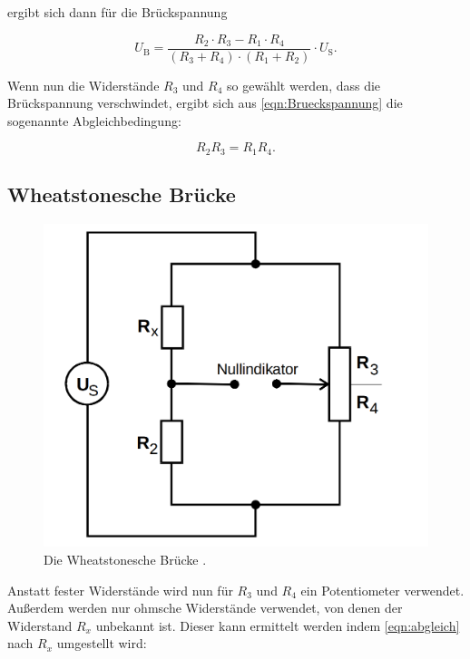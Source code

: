 ergibt sich dann für die Brückspannung 

\begin{equation}
    U_\text{B} = \frac{R_2\cdot R_3 - R_1 \cdot R_4}{(R_3 + R_4) \cdot (R_1 + R_2)} \cdot U_\text{S} .
    \label{eqn:Brueckspannung}
\end{equation}

Wenn nun die Widerstände $R_3$ und $R_4$ so gewählt werden, dass die Brückspannung verschwindet,
ergibt sich aus \eqref{eqn:Brueckspannung} die sogenannte Abgleichbedingung:

\begin{equation}
    R_2 R_3 = R_1 R_4 .
    \label{eqn:abgleich}
\end{equation}

\subsection{Wheatstonesche Brücke}

\begin{figure}
    \centering
    \includegraphics[scale=0.25]{content/Wheatstonesche.png}
    \caption{Die Wheatstonesche Brücke \cite[S. 219]{anleitung}.}
    \label{fig:wheatstonesche}
\end{figure}

Anstatt fester Widerstände wird nun für $R_3$ und $R_4$ ein Potentiometer verwendet.
Außerdem werden nur ohmsche Widerstände verwendet, von denen der Widerstand $R_x$ unbekannt ist.
Dieser kann ermittelt werden indem \eqref{eqn:abgleich} nach $R_x$ umgestellt wird:

